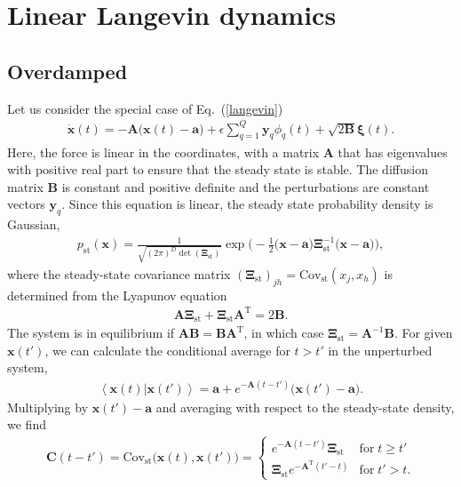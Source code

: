 \documentclass[aps,pre,twocolumn,superscriptaddress,notitlepage]{revtex4-2}
\newcommand{\Av}[1]{\left\langle #1 \right\rangle}
\renewcommand{\eqref}[1]{Eq.~(\ref{#1})}
\begin{document}
\section{Linear Langevin dynamics} \label{sec-linear}

\subsection{Overdamped} \label{sec-linear-over}
Let us consider the special case of \eqref{langevin}
\begin{align}
\dot{\bm{x}}(t) = -\bm{A} \big(\bm{x}(t) - \bm{a} \big) + \epsilon \sum_{q=1}^Q \bm{y}_q \phi_q(t) + \sqrt{2 \bm{B}} \bm{\xi}(t). \label{langevin-linear-over}
\end{align}
Here, the force is linear in the coordinates, with a matrix $\bm{A}$ that has eigenvalues with positive real part to ensure that the steady state is stable.
The diffusion matrix $\bm{B}$ is constant and positive definite and the perturbations are constant vectors $\bm{y}_q$.
Since this equation is linear, the steady state probability density is Gaussian,
\begin{align}
p_\text{st}(\bm{x}) = \frac{1}{ \sqrt{(2 \pi)^D \det(\bm{\Xi}_\text{st})}} \exp \bigg( - \frac{1}{2} \big( \bm{x} - \bm{a} \big) \bm{\Xi}_\text{st}^{-1} \big( \bm{x} - \bm{a} \big) \bigg) ,
\end{align}
where the steady-state covariance matrix $(\bm{\Xi}_\text{st})_{jh} = \text{Cov}_\text{st}(x_j,x_h)$ is determined from the Lyapunov equation
\begin{align}
\bm{A} \bm{\Xi}_\text{st} + \bm{\Xi}_\text{st} \bm{A}^\text{T} = 2 \bm{B} . \label{lyapunov}
\end{align}
The system is in equilibrium if $\bm{A} \bm{B} = \bm{B} \bm{A}^\text{T}$, in which case $\bm{\Xi}_\text{st} = \bm{A}^{-1} \bm{B}$.
For given $\bm{x}(t')$, we can calculate the conditional average for $t > t'$ in the unperturbed system,
\begin{align}
\Av{\bm{x}(t) \vert \bm{x}(t')} = \bm{a} + e^{-\bm{A}(t-t')} \big( \bm{x}(t') - \bm{a} \big) .
\end{align}
Multiplying by $\bm{x}(t') - \bm{a}$ and averaging with respect to the steady-state density, we find
\begin{align}
\bm{C}(t-t') = \text{Cov}_\text{st}\big(\bm{x}(t),\bm{x}(t') \big) = \left\lbrace \begin{array}{ll}
e^{-\bm{A}(t-t')} \bm{\Xi}_\text{st} &\text{for} \; t \geq t' \\[1 ex]
\bm{\Xi}_\text{st} e^{-\bm{A}^\text{T}(t'-t)} & \text{for} \; t' > t .
\end{array}  \right.
\end{align}
\end{document}
